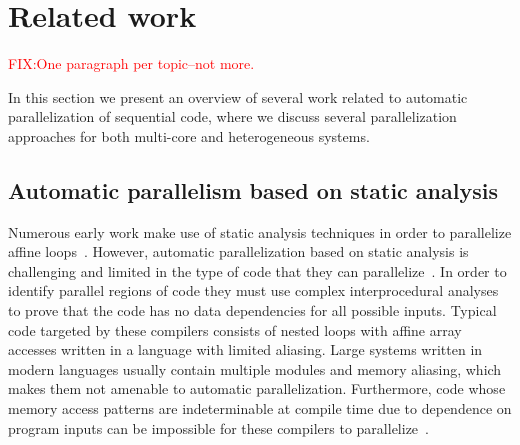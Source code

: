 \documentclass[a4paper,12pt]{article}
\newcommand\FIXME[1]{\textcolor{red}{FIX:}\textcolor{red}{#1}}
\begin{document}
\section{Related work}
\FIXME{One paragraph per topic--not more.}


In this section we present an overview of several work related to automatic
parallelization of sequential code, where we discuss several parallelization
approaches for both multi-core and heterogeneous systems.

\subsection{Automatic parallelism based on static analysis}

Numerous early work make use of static analysis techniques in order to
parallelize affine loops~\cite{kuck81,padua93,blume94,lim97,bondhugula08,misailovic13}.
However, automatic parallelization based on static analysis is challenging and limited
in the type of code that they can
parallelize~\cite{bruening98,kennedy01,chen03}.  In order to identify parallel
regions of code they must use complex interprocedural analyses to prove that
the code has no data dependencies for all possible inputs.  Typical code
targeted by these compilers consists of nested loops with affine array accesses
written in a language with limited aliasing. Large systems written in modern
languages usually contain multiple modules and memory aliasing, which makes
them not amenable to automatic parallelization.  Furthermore, code whose memory
access patterns are indeterminable at compile time due to dependence on program
inputs can be impossible for these compilers to parallelize~\cite{bruening98}.
\end{document}
